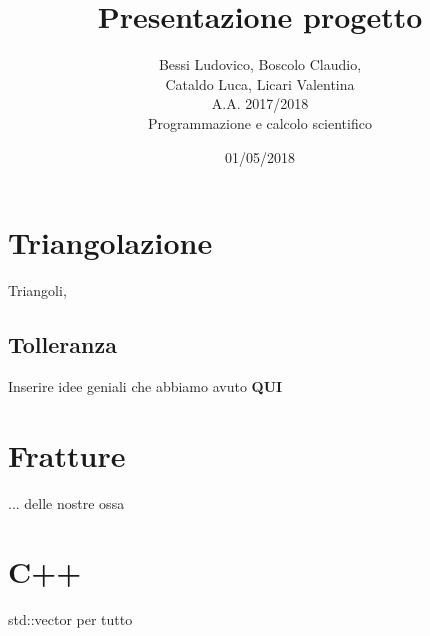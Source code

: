 \documentclass[11pt, a4paper]{article}
\begin{document}
\author{Bessi Ludovico, Boscolo Claudio,\\ Cataldo Luca, Licari Valentina\\ A.A. 2017/2018\\Programmazione e calcolo scientifico}
\title{Presentazione progetto\\}
\date{01/05/2018}
\maketitle
\tableofcontents
\newpage

\section{Triangolazione}
Triangoli, 
\subsection{Tolleranza}
Inserire idee geniali che abbiamo avuto \textbf{QUI}




\section{Fratture}
... delle nostre ossa


\section{C++}
std::vector per tutto
\end{document}
